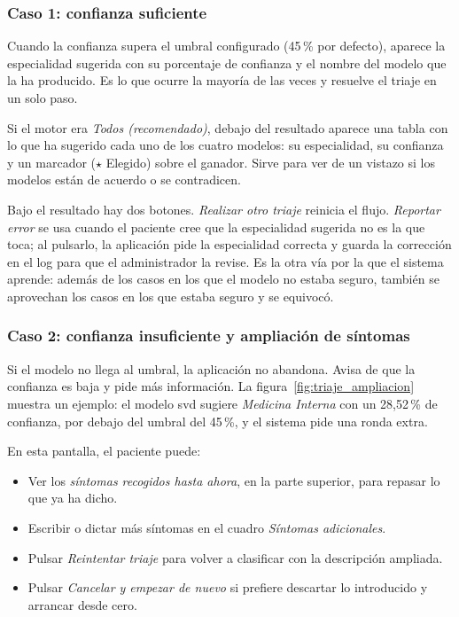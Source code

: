 \subsubsection*{Caso 1: confianza suficiente}

Cuando la confianza supera el umbral configurado (45\,\% por defecto), aparece la especialidad sugerida con su porcentaje de confianza y el nombre del modelo que la ha producido. Es lo que ocurre la mayoría de las veces y resuelve el triaje en un solo paso.

Si el motor era \textit{Todos (recomendado)}, debajo del resultado aparece una tabla con lo que ha sugerido cada uno de los cuatro modelos: su especialidad, su confianza y un marcador ($\star$ Elegido) sobre el ganador. Sirve para ver de un vistazo si los modelos están de acuerdo o se contradicen.

Bajo el resultado hay dos botones. \textit{Realizar otro triaje} reinicia el flujo. \textit{Reportar error} se usa cuando el paciente cree que la especialidad sugerida no es la que toca; al pulsarlo, la aplicación pide la especialidad correcta y guarda la corrección en el log para que el administrador la revise. Es la otra vía por la que el sistema aprende: además de los casos en los que el modelo no estaba seguro, también se aprovechan los casos en los que estaba seguro y se equivocó.

\subsubsection*{Caso 2: confianza insuficiente y ampliación de síntomas}

Si el modelo no llega al umbral, la aplicación no abandona. Avisa de que la confianza es baja y pide más información. La figura~\ref{fig:triaje_ampliacion} muestra un ejemplo: el modelo \acrshort{svd} sugiere \textit{Medicina Interna} con un 28,52\,\% de confianza, por debajo del umbral del 45\,\%, y el sistema pide una ronda extra.


En esta pantalla, el paciente puede:

\begin{itemize}
	\item Ver los \textit{síntomas recogidos hasta ahora}, en la parte superior, para repasar lo que ya ha dicho.
	\item Escribir o dictar más síntomas en el cuadro \textit{Síntomas adicionales}.
	\item Pulsar \textit{Reintentar triaje} para volver a clasificar con la descripción ampliada.
	\item Pulsar \textit{Cancelar y empezar de nuevo} si prefiere descartar lo introducido y arrancar desde cero.
\end{itemize}

